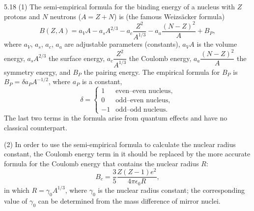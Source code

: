 \begin{solution}{5.18}
(1) The semi-empirical formula for the binding energy of a nucleus with $Z$ protons and $N$
neutrons ($A=Z+N$) is (the famous Weizs\"acker formula)
\begin{equation*}
B(Z,A)=a_V A-a_sA^{2/3}-a_c\frac{Z^2}{A^{1/3}}-a_a\frac{(N-Z)^2}{A}+B_P,
\end{equation*}
where $a_V$, $a_s$, $a_c$, $a_a$ are adjustable parameters (constants), $a_V A$ is the volume
energy, $a_sA^{2/3}$ the surface energy, $a_c\dfrac{Z^2}{A^{1/3}}$ the Coulomb energy,
$a_a\dfrac{(N-Z)^2}{A}$ the symmetry energy, and $B_P$ the pairing energy. The empirical formula
for $B_P$ is $B_P=\delta a_PA^{-1/2}$, where $a_P$ is a constant,
\begin{equation*}
\delta=
\begin{cases}
1 & \text{even--even nucleus},\\
0 & \text{odd--even nucleus},\\
-1 & \text{odd--odd nucleus}.
\end{cases}
\end{equation*}
The last two terms in the formula arise from quantum effects and have no classical counterpart.

(2) In order to use the semi-empirical formula to calculate the nuclear radius constant, the
Coulomb energy term in it should be replaced by the more accurate formula for the Coulomb energy
that contains the nuclear radius $R$:
\begin{equation*}
B_c=\frac{3}{5}\frac{Z(Z-1)e^2}{4\pi\epsilon_0R},
\end{equation*}
in which $R=\gamma_0A^{1/3}$, where $\gamma_0$ is the nuclear radius constant; the corresponding
value of $\gamma_0$ can be determined from the mass difference of mirror nuclei.


\end{solution}
